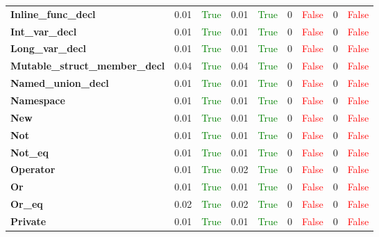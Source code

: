 \documentclass{article}
\begin{document}
\begin{xltabular}{\textwidth}{lcccccccc}
\textbf{{\fontsize{10}{12}\selectfont Inline\_func\_decl}}& 0.01&\textcolor{green}{True}& 0.01&\textcolor{green}{True}& 0&\textcolor{red}{False}& 0&\textcolor{red}{False} \\[0.5ex]
\textbf{{\fontsize{10}{12}\selectfont Int\_var\_decl}}& 0.01&\textcolor{green}{True}& 0.01&\textcolor{green}{True}& 0&\textcolor{red}{False}& 0&\textcolor{red}{False} \\[0.5ex]
\textbf{{\fontsize{10}{12}\selectfont Long\_var\_decl}}& 0.01&\textcolor{green}{True}& 0.01&\textcolor{green}{True}& 0&\textcolor{red}{False}& 0&\textcolor{red}{False} \\[0.5ex]
\textbf{{\fontsize{10}{12}\selectfont Mutable\_struct\_member\_decl}}& 0.04&\textcolor{green}{True}& 0.04&\textcolor{green}{True}& 0&\textcolor{red}{False}& 0&\textcolor{red}{False} \\[0.5ex]
\textbf{{\fontsize{10}{12}\selectfont Named\_union\_decl}}& 0.01&\textcolor{green}{True}& 0.01&\textcolor{green}{True}& 0&\textcolor{red}{False}& 0&\textcolor{red}{False} \\[0.5ex]
\textbf{{\fontsize{10}{12}\selectfont Namespace}}& 0.01&\textcolor{green}{True}& 0.01&\textcolor{green}{True}& 0&\textcolor{red}{False}& 0&\textcolor{red}{False} \\[0.5ex]
\textbf{{\fontsize{10}{12}\selectfont New}}& 0.01&\textcolor{green}{True}& 0.01&\textcolor{green}{True}& 0&\textcolor{red}{False}& 0&\textcolor{red}{False} \\[0.5ex]
\textbf{{\fontsize{10}{12}\selectfont Not}}& 0.01&\textcolor{green}{True}& 0.01&\textcolor{green}{True}& 0&\textcolor{red}{False}& 0&\textcolor{red}{False} \\[0.5ex]
\textbf{{\fontsize{10}{12}\selectfont Not\_eq}}& 0.01&\textcolor{green}{True}& 0.01&\textcolor{green}{True}& 0&\textcolor{red}{False}& 0&\textcolor{red}{False} \\[0.5ex]
\textbf{{\fontsize{10}{12}\selectfont Operator}}& 0.01&\textcolor{green}{True}& 0.02&\textcolor{green}{True}& 0&\textcolor{red}{False}& 0&\textcolor{red}{False} \\[0.5ex]
\textbf{{\fontsize{10}{12}\selectfont Or}}& 0.01&\textcolor{green}{True}& 0.01&\textcolor{green}{True}& 0&\textcolor{red}{False}& 0&\textcolor{red}{False} \\[0.5ex]
\textbf{{\fontsize{10}{12}\selectfont Or\_eq}}& 0.02&\textcolor{green}{True}& 0.02&\textcolor{green}{True}& 0&\textcolor{red}{False}& 0&\textcolor{red}{False} \\[0.5ex]
\textbf{{\fontsize{10}{12}\selectfont Private}}& 0.01&\textcolor{green}{True}& 0.01&\textcolor{green}{True}& 0&\textcolor{red}{False}& 0&\textcolor{red}{False} \\[0.5ex]

\end{xltabular}
\end{document}
